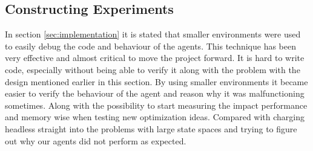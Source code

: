\subsection{Constructing Experiments }
\label{sec:eval_implementation}
In section \ref{sec:implementation} it is stated that smaller environments were used to easily debug the code and behaviour of the agents. This technique has been very effective and almost critical to move the project forward. It is hard to write code, especially without being able to verify it along with the problem with the design mentioned earlier in this section. By using smaller environments it became easier to verify the behaviour of the agent and reason why it was malfunctioning sometimes. Along with the possibility to start measuring the impact performance and memory wise when testing new optimization ideas. Compared with charging headless straight into the problems with large state spaces and trying to figure out why our agents did not perform as expected. 
